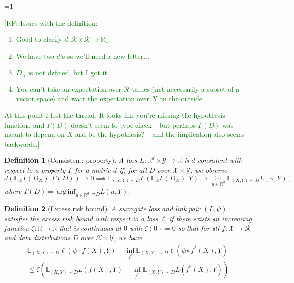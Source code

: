 \documentclass{article}
\newcommand{\Comments}{1}
\newcommand{\mynote}[2]{\ifnum\Comments=1\textcolor{#1}{#2}\fi}
\newcommand{\raf}[1]{\mynote{green}{[RF: #1]}}
\newcommand{\jessie}[1]{\mynote{purple}{[JF: #1]}}
\newcommand{\reals}{\mathbb{R}}
\newcommand{\simplex}{\Delta_\Y}
\newcommand{\E}{\mathbb{E}}
\newcommand{\R}{\mathcal{R}}
\newcommand{\X}{\mathcal{X}}
\newcommand{\Y}{\mathcal{Y}}
\newcommand{\toto}{\rightrightarrows}
\newtheorem{definition}{Definition}
\DeclareMathOperator*{\arginf}{arg\,inf}
\begin{document}

\raf{Issues with the definition:
\begin{enumerate}
\item Good to clarify $d:\R\times\R\to\reals_+$
\item We have two $d$'s so we'll need a new letter...
\item $D_X$ is not defined, but I got it
\item You can't take an expectation over $\R$ values (not necessarily a subset of a vector space) and want the expectation over $X$ on the outside
\end{enumerate}
At this point I lost the thread. It looks like you're missing the hypothesis function, and $\Gamma(D)$ doesn't seem to type check -- but perhaps $\Gamma(D)$ was meant to depend on $X$ and be the hypothesis? -- and the implication also seems backwards.}
\begin{definition}[Consistent: property]
	A loss $L : \reals^d \times \Y \to \reals$ is \emph{$d$-consistent with respect to a property} $\Gamma$ for a metric $d$ if, for all $D$ over $\X \times \Y$,  we observe
	\begin{equation}
	d(\E_X \Gamma(D_X), \Gamma(D)) \to 0 \implies \E_{(X,Y) \sim D} L(\E_X \Gamma(D_X), Y) \to \inf_{u \in \reals^d} \E_{(X,Y) \sim D} L(u, Y)~,~
	\end{equation}
	where $\Gamma(D) = \arginf_{u \in \reals^d} \E_D L(u, Y)$.
\end{definition}

\begin{definition}[Excess risk bound]
	A surrogate loss and link pair $(L,\psi)$ satisfies the \emph{excess risk bound} with respect to a loss $\ell$ if there exists an increasing function $\zeta : \reals \to \reals$ that is continuous at $0$ with $\zeta(0) = 0$ so that for all $f:\X \to \R$ and data distributions $D$ over $\X \times \Y$, we have
	\begin{multline}
	\E_{(X,Y) \sim D} \ell(\psi \circ f(X), Y) - \inf_{f^*} \E_{(X,Y) \sim D} \ell(\psi \circ f^*(X), Y) \\ 
	\leq \zeta \left( \E_{(X,Y) \sim D} L(f(X), Y) - \inf_{f^*} \E_{(X,Y) \sim D} L(f^*(X), Y) \right)
	\end{multline}
\end{definition}
\end{document}
